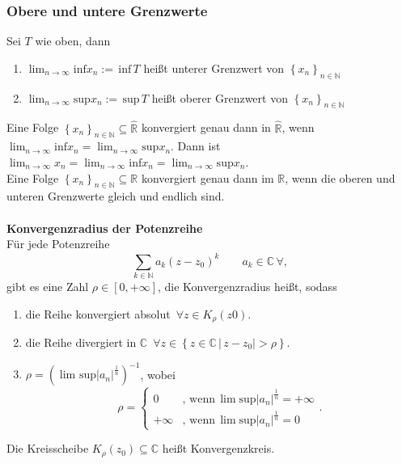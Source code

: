 \documentclass[a4paper,12pt]{article}
\begin{document}
\subsubsection{Obere und untere Grenzwerte}
Sei $T$ wie oben, dann
\begin{enumerate}[label=\arabic*.]
        \item $\lim_{n\rightarrow \infty}\text{inf}x_n:=\,\text{inf}\,T$ heißt unterer Grenzwert von $\left\{x_n\right\}_{n  \in \mathbb{N}}$ 
        \item $\lim_{n\rightarrow \infty}\text{sup}x_n:=\,\text{sup}\,T$ heißt oberer Grenzwert von $\left\{x_n\right\}_{n  \in \mathbb{N}}$ 
\end{enumerate}
Eine Folge $\left\{x_n\right\}_{n  \in \mathbb{N}}\subseteq \hat{\mathbb{R}}$ konvergiert genau dann in $\hat{\mathbb{R}}$, wenn $\lim_{n\rightarrow \infty}\text{inf}x_n=\lim_{n\rightarrow \infty}\text{sup}x_n$. Dann ist $\lim_{n\rightarrow \infty}x_n=\lim_{n\rightarrow \infty}\text{inf}x_n=\lim_{n\rightarrow \infty}\text{sup}x_n$.\\
Eine Folge $\left\{x_n\right\}_{n  \in \mathbb{N}}\subseteq \mathbb{R}$ konvergiert genau dann im $\mathbb{R}$, wenn die oberen und unteren Grenzwerte gleich und endlich sind.
\\\hfill\\\textbf{Konvergenzradius der Potenzreihe}\\ 
Für jede Potenzreihe
\[ 
        \sum_{k \in \mathbb{N}}^{}a_k\left(z-z_0\right)^k\qquad a_k \in \mathbb{C}\,\forall 
,\] 
gibt es eine Zahl $\rho \in [0,+\infty]$, die Konvergenzradius heißt, sodass
\begin{enumerate}[label=\arabic*.]
        \item die Reihe konvergiert absolut $\,\forall z \in K_\rho (z0)$.
        \item die Reihe divergiert in $\mathbb{C}$ $\,\forall z \in \left\{z \in \mathbb{C}\,|\, z-z_0|>\rho \right\}$.
        \item $\rho =\left(\lim_{}\text{sup}|a_n|^{\tfrac{1}{n}}\right)^{-1}$, wobei
                \[ 
                        \rho =\begin{cases}
                                0&,\,\text{wenn}\,\lim_{}\text{sup}|a_n|^{\tfrac{1}{n}}=+\infty\\
                                +\infty&,\,\text{wenn}\,\lim_{}\text{sup}|a_n|^{\tfrac{1}{n}}=0
                        \end{cases}
                .\] 
\end{enumerate}
Die Kreisscheibe $K_\rho (z_0)\subseteq \mathbb{C}$ heißt Konvergenzkreis.
\end{document}
